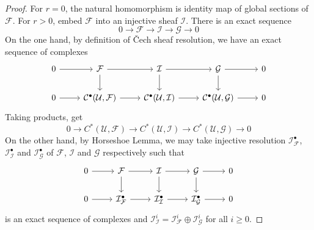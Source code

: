 \documentclass{ctexart}
\begin{document}
\begin{proof}
    For $r = 0$, the natural homomorphism is identity map of global sections of $\mathcal{F}$.
    For $r > 0$, embed $\mathcal{F}$ into an injective sheaf $\mathcal{I}$.
    There is an exact sequence
    \begin{equation*}
        0 \longrightarrow \mathcal{F} \longrightarrow \mathcal{I} \longrightarrow \mathcal{G} \longrightarrow 0
    \end{equation*}
    On the one hand, by definition of Čech sheaf resolution, we have an exact sequence of complexes
    \begin{equation*}
        \begin{tikzcd}
            0 \arrow[r] &
            \mathcal{F} \arrow[r] \arrow[d] &
            \mathcal{I} \arrow[r] \arrow[d] &
            \mathcal{G} \arrow[r] \arrow[d] &
            0 \\
            0 \arrow[r] &
            \mathcal{C}^{\bullet}(\mathcal{U}, \mathcal{F}) \arrow[r] &
            \mathcal{C}^{\bullet}(\mathcal{U}, \mathcal{I}) \arrow[r] &
            \mathcal{C}^{\bullet}(\mathcal{U}, \mathcal{G}) \arrow[r] &
            0
        \end{tikzcd}
    \end{equation*}
    Taking products, get
    \begin{equation*}
        0 \longrightarrow C^{\ast}(\mathcal{U}, \mathcal{F}) \longrightarrow C^{\ast}(\mathcal{U}, \mathcal{I}) \longrightarrow C^{\ast}(\mathcal{U}, \mathcal{G}) \longrightarrow 0
    \end{equation*}
    On the other hand, by Horseshoe Lemma, we may take injective resolution $\mathcal{I}_{\mathcal{F}}^{\bullet}$, $\mathcal{I}_{\mathcal{I}}^{\bullet}$ and $\mathcal{I}_{\mathcal{G}}^{\bullet}$ of $\mathcal{F}$, $\mathcal{I}$ and $\mathcal{G}$ respectively such that
    \begin{equation*}
        \begin{tikzcd}
            0 \arrow[r] &
            \mathcal{F} \arrow[r] \arrow[d] &
            \mathcal{I} \arrow[r] \arrow[d] &
            \mathcal{G} \arrow[r] \arrow[d] &
            0 \\
            0 \arrow[r] &
            \mathcal{I}_{\mathcal{F}}^{\bullet} \arrow[r] &
            \mathcal{I}_{\mathcal{I}}^{\bullet} \arrow[r] &
            \mathcal{I}_{\mathcal{G}}^{\bullet} \arrow[r] &
            0
        \end{tikzcd}
    \end{equation*}
    is an exact sequence of complexes and $\mathcal{I}_{\mathcal{I}}^{i} = \mathcal{I}_{\mathcal{F}}^{i} \oplus \mathcal{I}_{\mathcal{G}}^{i}$ for all $i \ge 0$.

\end{proof}
\end{document}
